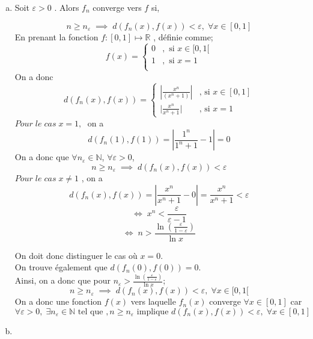 \documentclass[letterpaper,12pt,oneside,final]{book}
\begin{document}
\begin{enumerate}[a)]

\item %
   Soit $ \varepsilon > 0 $
. Alors $f_n$ converge vers $f$ si, 

\[
n \geq n_\varepsilon\; \implies\; d \left( f_n(x), f(x) \right) < \varepsilon,\;  \forall x
\in [0,1]
\]
En prenant la fonction $f: [0,1] \mapsto \mathbb{R} $  , définie comme; 
\[
f(x) = \begin{cases}
    0 & , \text{ si } x\in [0,1[\\
    1 & , \text{ si } x=1\\
\end{cases}
\]
On a donc
\[
d\left( f_n(x), f(x) \right) = \begin{cases}
    \left| \frac{x^{n}}{(x^{n}+1)} \right| &  \text{, si } x \in [0,1] \\
    \big\vert \frac{x^{n}}{x^{n}+1}  \big\vert & \text{, si } x = 1
\end{cases}    
\]
$Pour\;le\;cas\;x= 1,\;$ on\; a
\[
d\left( f_n(1), f(1) \right) = \left \vert \frac{1^{n}}{1^{n}+1}-1 \right \vert = 0 
\]
On a donc que $\forall n_{\varepsilon} \in \mathbb{N}$, $\forall \varepsilon > 0$, 
\[
n \geq n_\varepsilon\; \implies\; d \left( f_n(x), f(x) \right) < \varepsilon 
\]
$Pour\;le\;cas\;x \neq 1$ , on a
\[
    d\left( f_n(x), f(x) \right) = \left \vert \frac{x^{n}}{x^{n}+1}-0 \right \vert =  \frac{x^{n}}{x^{n}+1} < \varepsilon  
\]
\[
\iff \; x^{n} < \frac{\varepsilon}{\varepsilon -1}  
\]
\[
\iff \; n > \frac{\ln\left( \frac{\varepsilon}{1- \varepsilon } \right)}{\ln x}
\]

On doit donc distinguer le cas où $x=0$.\\ On trouve également que $d(f_n(0),f(0)) = 0. $\\ 
 Ainsi, on a donc que pour $n_\varepsilon > \frac{\ln\left( \frac{\varepsilon}{1- \varepsilon } \right)}{\ln x}$;
 \[
    n \geq n_\varepsilon\; \implies\; d \left( f_n(x), f(x) \right) < \varepsilon,\;  \forall x \in [0,1[
 \]
On a donc une fonction $f(x)$ vers laquelle $f_n(x)$ converge $\forall x \in [0,1]$ car
\[
\forall \varepsilon > 0,\; \exists n_\varepsilon \in \mathbb{N} \text{ tel que }, 
n\geq n_{\varepsilon} \text{ implique } d \left( f_n(x), f(x) \right) < \varepsilon,\;  \forall x
\in [0,1] 
\]
\item %




\end{enumerate}
\end{document}
